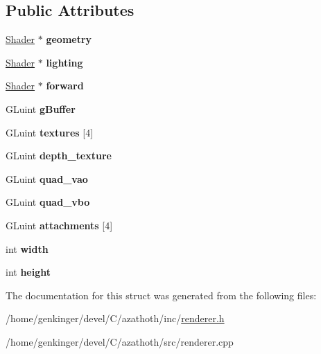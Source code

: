 \subsection*{Public Attributes}
\begin{DoxyCompactItemize}
\item 
\mbox{\label{structRenderer_a22d429c02df9d986bcb3d095dd10c568}} 
\mbox{\hyperlink{classShader}{Shader}} $\ast$ {\bfseries geometry}
\item 
\mbox{\label{structRenderer_a0aaecf6a0dc9d5655f59f6812ed79f65}} 
\mbox{\hyperlink{classShader}{Shader}} $\ast$ {\bfseries lighting}
\item 
\mbox{\label{structRenderer_a108a2db284d1cfeeaafce15cce3f6050}} 
\mbox{\hyperlink{classShader}{Shader}} $\ast$ {\bfseries forward}
\item 
\mbox{\label{structRenderer_ad3b4aa29c8645c7a686b9d74fd147b08}} 
G\+Luint {\bfseries g\+Buffer}
\item 
\mbox{\label{structRenderer_a92b8ea66fd0ee7b5739e5c3985c9f008}} 
G\+Luint {\bfseries textures} \mbox{[}4\mbox{]}
\item 
\mbox{\label{structRenderer_a7aeea16ce17f9c53f56d3a8bf1ddaff1}} 
G\+Luint {\bfseries depth\+\_\+texture}
\item 
\mbox{\label{structRenderer_a2ded391feba87f96a49e9953e40d9c49}} 
G\+Luint {\bfseries quad\+\_\+vao}
\item 
\mbox{\label{structRenderer_a674409c91c0c210039fbec7a0820b884}} 
G\+Luint {\bfseries quad\+\_\+vbo}
\item 
\mbox{\label{structRenderer_a6f9eca105d59d25862cd99dfd73740d6}} 
G\+Luint {\bfseries attachments} \mbox{[}4\mbox{]}
\item 
\mbox{\label{structRenderer_a15d70054c4cc503d73a85adbde3d6e3e}} 
int {\bfseries width}
\item 
\mbox{\label{structRenderer_ac5c41bea3debfd191abd29b3aa209960}} 
int {\bfseries height}
\end{DoxyCompactItemize}


The documentation for this struct was generated from the following files\+:\begin{DoxyCompactItemize}
\item 
/home/genkinger/devel/\+C/azathoth/inc/\mbox{\hyperlink{renderer_8h}{renderer.\+h}}\item 
/home/genkinger/devel/\+C/azathoth/src/renderer.\+cpp\end{DoxyCompactItemize}
